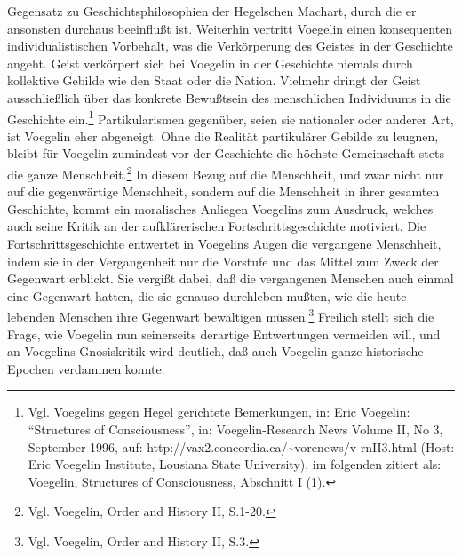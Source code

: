 Gegensatz zu Geschichtsphilosophien der Hegelschen Machart, durch die er
ansonsten durchaus beeinflußt ist. Weiterhin vertritt Voegelin einen
konsequenten individualistischen Vorbehalt, was die Verkörperung des Geistes
in der Geschichte angeht. Geist verkörpert sich bei Voegelin in der Geschichte
niemals durch kollektive Gebilde wie den Staat oder die Nation. Vielmehr
dringt der Geist ausschließlich über das konkrete Bewußtsein des menschlichen
Individuums in die Geschichte ein.\footnote{Vgl. Voegelins gegen Hegel
  gerichtete Bemerkungen, in: Eric Voegelin: "`Structures of Consciousness"',
  in: Voegelin-Research News Volume II, No 3, September 1996, auf:
  http://vax2.concordia.ca/\~{ }vorenews/v-rnII3.html (Host: Eric Voegelin
  Institute, Lousiana State University), im folgenden zitiert als: Voegelin,
  Structures of Consciousness, Abschnitt I (1).} Partikularismen gegenüber,
seien sie nationaler oder anderer Art, ist Voegelin eher abgeneigt.  Ohne die
Realität partikulärer Gebilde zu leugnen, bleibt für Voegelin zumindest vor
der Geschichte die höchste Gemeinschaft stets die ganze
Menschheit.\footnote{Vgl. Voegelin, Order and History II, S.1-20.} In diesem
Bezug auf die Menschheit, und zwar nicht nur auf die gegenwärtige Menschheit,
sondern auf die Menschheit in ihrer gesamten Geschichte, kommt ein moralisches
Anliegen Voegelins zum Ausdruck, welches auch seine Kritik an der
aufklärerischen Fortschrittsgeschichte motiviert. Die Fortschrittsgeschichte
entwertet in Voegelins Augen die vergangene Menschheit, indem sie in der
Vergangenheit nur die Vorstufe und das Mittel zum Zweck der Gegenwart
erblickt. Sie vergißt dabei, daß die vergangenen Menschen auch einmal eine
Gegenwart hatten, die sie genauso durchleben mußten, wie die heute lebenden
Menschen ihre Gegenwart bewältigen müssen.\footnote{Vgl. Voegelin, Order and
  History II, S.3.}  Freilich stellt sich die Frage, wie Voegelin nun
seinerseits derartige Entwertungen vermeiden will, und an Voegelins
Gnosiskritik wird deutlich, daß auch Voegelin ganze historische Epochen
verdammen konnte.

